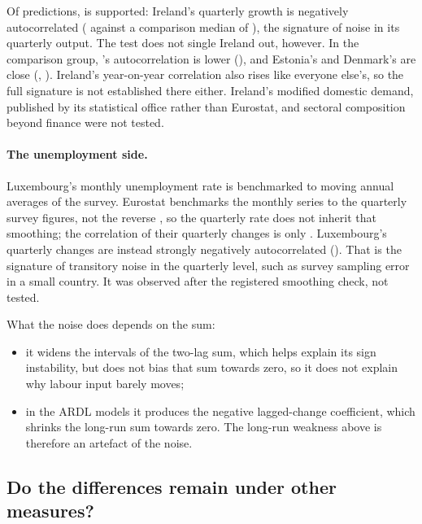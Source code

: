 Of  predictions,  is supported: Ireland's quarterly growth
is negatively autocorrelated ( against a comparison median of
), the signature of noise in its quarterly output. The test does not
single Ireland out, however. In the comparison group, 's
autocorrelation is lower (), and Estonia's and Denmark's are close
(, ). Ireland's year-on-year correlation also rises like
everyone else's, so the full signature is not established there either.
Ireland's modified domestic demand, published by its statistical office rather than
Eurostat, and sectoral composition beyond finance were not tested.

\paragraph{The unemployment side.} Luxembourg's monthly unemployment rate is benchmarked
to moving annual averages of the survey. Eurostat benchmarks the monthly series to the
quarterly survey figures, not the reverse \citep{eurostat_une_rt_m_esms}, so the quarterly
rate does not inherit that smoothing; the correlation of their quarterly changes is only
. Luxembourg's quarterly changes are instead strongly negatively
autocorrelated (). That is the signature of transitory noise in the
quarterly level, such as survey sampling error in a small country. It was observed after
the registered smoothing check, not tested.

What the noise does depends on the sum:
\begin{itemize}
  \item it widens the intervals of the two-lag sum, which helps explain its sign
    instability, but does not bias that sum towards zero, so it does not explain why
    labour input barely moves;
  \item in the ARDL models it produces the negative lagged-change coefficient, which
    shrinks the long-run sum towards zero. The long-run weakness above is therefore an
    artefact of the noise.
\end{itemize}

\subsection{Do the differences remain under other measures?}

